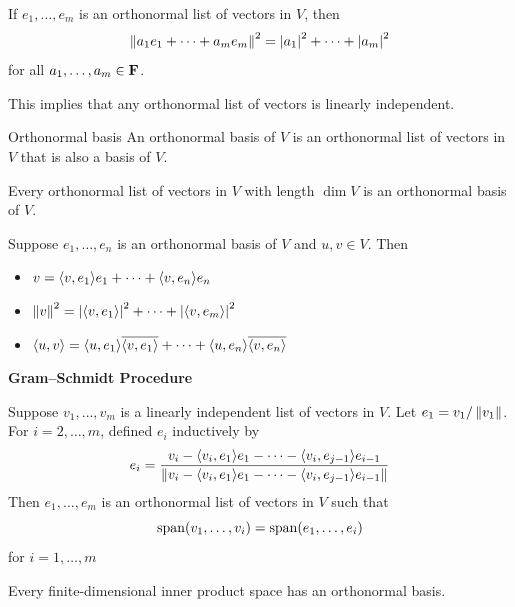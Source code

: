 \documentclass[12pt,a4paper]{article}
\begin{document}
    \begin{prop}
        If $e_1,\dots,e_m$ is an orthonormal list of vectors in $V$, then
        $$
        \left\lVert a_1e_1+\cdots+a_me_m\right\rVert^2=\left\lvert a_1\right\rvert^2+\cdots+\left\lvert a_m\right\rvert^2
        $$
        for all $a_1,\dots,a_m\in\mathbf{F}$. 
    \end{prop}
    \begin{remark}
        This implies that any orthonormal list of vectors is linearly independent.
    \end{remark}
    \hfill  

    \begin{defi}{Orthonormal basis}
        An orthonormal basis of $V$ is an orthonormal list of vectors in $V$ that is also a basis of $V$.
    \end{defi}
    \begin{prop}
        Every orthonormal list of vectors in $V$ with length $\dim V$ is an orthonormal basis of $V$.
    \end{prop}
    \hfill

    \begin{prop}\label{6.19}
        Suppose $e_1,\dots,e_n$ is an orthonormal basis of $V$ and $u,v\in V$. Then 
        \begin{itemize}
            \item $v=\langle v,e_1\rangle e_1+\cdots+\langle v,e_n\rangle e_n$
            \item $\left\lVert v\right\rVert^2=\left\lvert \langle v,e_1\rangle\right\rvert^2+\cdots+\left\lvert \langle v,e_m\rangle\right\rvert^2$
            \item $\langle u,v\rangle=\langle u,e_1\rangle\overline{\langle v,e_1\rangle}+\cdots+\langle u,e_n\rangle\overline{\langle v,e_n\rangle}$
        \end{itemize}
    \end{prop}
    \hfill

    \begin{thm}\label{6.20}
        \textbf{Gram–Schmidt Procedure}

        Suppose $v_1,\dots,v_m$ is a linearly independent list of vectors in $V$. Let $e_1=v_1/\left\lVert v_1\right\rVert$. For $i=2,\dots,m$, defined $e_i$ inductively by
        $$
        e_i=\frac{v_i-\langle v_i,e_1\rangle e_1-\cdots-\langle v_i,e_{j-1}\rangle e_{i-1}}{\left\lVert v_i-\langle v_i,e_1\rangle e_1-\cdots-\langle v_i,e_{j-1}\rangle e_{i-1}\right\rVert}
        $$
        Then $e_1,\dots,e_m$ is an orthonormal list of vectors in $V$ such that
        $$
        \operatorname{span}(v_1,\dots,v_i)=\operatorname{span}(e_1,\dots,e_i)
        $$
        for $i=1,\dots,m$
    \end{thm}
    \begin{cor}
        Every finite-dimensional inner product space has an orthonormal basis.
    \end{cor}
    \hfill
\end{document}
